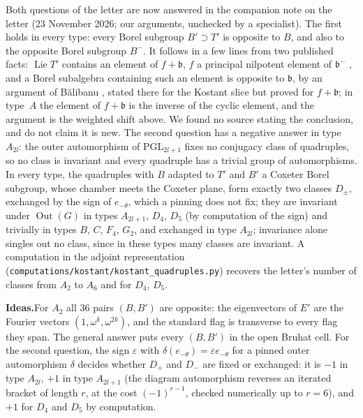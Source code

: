 \documentclass[11pt]{article}
\theoremstyle{definition}
\theoremstyle{plain}\newtheorem*{proposition}{Proposition}\theoremstyle{definition}
\newcommand{\entry}[1]{\par\medskip\noindent\textbf{#1}\enspace}
\newcommand{\ideas}{\entry{Ideas.}}
\begin{document}
Both questions of the letter are now answered in the companion note on the letter \cite{kostantnote} (23 November 2026; our arguments, unchecked by a specialist). The first holds in every type: every Borel subgroup $B' \supset T'$ is opposite to $B$, and also to the opposite Borel subgroup $B^-$. It follows in a few lines from two published facts: $\operatorname{Lie} T'$ contains an element of $f + \mathfrak b$, $f$ a principal nilpotent element of $\mathfrak b^-$ \cite[Thm~6.7]{kostant}, and a Borel subalgebra containing such an element is opposite to $\mathfrak b$, by an argument of Bălibanu \cite[Lemma~4.5]{balibanu}, stated there for the Kostant slice but proved for $f + \mathfrak b$; in type~$A$ the element of $f + \mathfrak b$ is the inverse of the cyclic element, and the argument is the weighted shift above. We found no source stating the conclusion, and do not claim it is new. The second question has a negative answer in type $A_{2l}$: the outer automorphism of $\mathrm{PGL}_{2l+1}$ fixes no conjugacy class of quadruples, so no class is invariant and every quadruple has a trivial group of automorphisms. In every type, the quadruples with $B$ adapted to $T'$ and $B'$ a Coxeter Borel subgroup, whose chamber meets the Coxeter plane, form exactly two classes $D_\pm$, exchanged by the sign of $e_{-\theta}$, which a pinning does not fix; they are invariant under $\operatorname{Out}(G)$ in types $A_{2l+1}$, $D_4$, $D_5$ (by computation of the sign) and trivially in types $B$, $C$, $F_4$, $G_2$, and exchanged in type $A_{2l}$; invariance alone singles out no class, since in these types many classes are invariant. A computation in the adjoint representation (\nolinkurl{computations/kostant/kostant_quadruples.py}) recovers the letter's number of classes from $A_2$ to $A_6$ and for $D_4$, $D_5$.

\ideas For $A_2$ all $36$ pairs $(B, B')$ are opposite: the eigenvectors of $E'$ are the Fourier vectors $(1, \omega^k, \omega^{2k})$, and the standard flag is transverse to every flag they span. The general answer puts every $(B, B')$ in the open Bruhat cell. For the second question, the sign $\varepsilon$ with $\delta(e_{-\theta}) = \varepsilon e_{-\theta}$ for a pinned outer automorphism $\delta$ decides whether $D_+$ and $D_-$ are fixed or exchanged: it is $-1$ in type $A_{2l}$, $+1$ in type $A_{2l+1}$ (the diagram automorphism reverses an iterated bracket of length $r$, at the cost $(-1)^{r-1}$, checked numerically up to $r = 6$), and $+1$ for $D_4$ and $D_5$ by computation.
\end{document}
